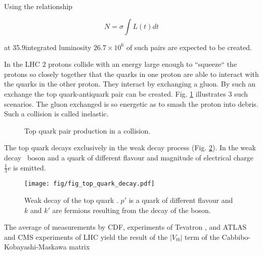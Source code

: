Using the relationship

\begin{equation}
N=\sigma\int L(t)dt
\end{equation}

at 35.9\fbinv integrated luminosity $26.7\times10^{6}$ of such pairs are expected to be created. 

In the LHC 2 protons collide with an energy large enough to ``squeeze`` the protons so closely together that the quarks in one proton are able to interact with the quarks in the other proton. They interact by exchanging a gluon. By such an exchange the top quark-antiquark pair can be created. Fig. \ref{fig:top_quark_productions} illustrates 3 such scenarios. The gluon exchanged is so energetic as to smash the proton into debris. Such a collision is called inelastic.

\begin{figure}[h!]
  \centering
  \def\twidth{0.3}

  \caption{Top quark pair production in a \Pp\Pp collision.}
  \label{fig:top_quark_productions}
\end{figure}

The top quark decays exclusively in the weak decay process (Fig. \ref{fig:quark_decay}). In the weak decay \PW\ boson and a quark of different flavour and magnitude of electrical charge $\frac{1}{3}e$ is emitted. 

\begin{figure}[H]
  \centering
  \texttt{[image: fig/fig\_top\_quark\_decay.pdf]}
  \caption{Weak decay of the top quark \cPqt. $p'$ is a quark of different flavour and $k$ and $k'$ are fermions resulting from the decay of the \PW boson.}
  \label{fig:quark_decay}
\end{figure}

The average of measurements by CDF, \DZERO experiments of Tevatron \cite{Aaltonen:2015cra}, and ATLAS and CMS experiments of LHC \cite{twiki:tt_curve_toplhcwg_sep18} yield the result of the $|V_{tb}|$ term of the Cabbibo-Kobayashi-Maskawa matrix

